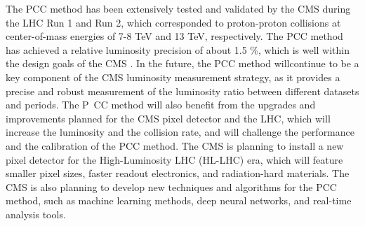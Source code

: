 The PCC method has been extensively tested and validated by the CMS during the LHC Run 1 and Run 2, which corresponded to proton-proton collisions at center-of-mass energies of 7-8 TeV and 13 TeV, respectively. The PCC method has achieved a relative luminosity precision of about 1.5 \%, which is well within the design goals of the CMS \cite{pas_18}. In the future, the PCC method willcontinue to be a key component of the CMS luminosity measurement strategy, as it provides a precise and robust measurement of the luminosity ratio between different datasets and periods. The P\
CC method will also benefit from the upgrades and improvements planned for the CMS pixel detector and the LHC, which will increase the luminosity and the collision rate, and will challenge the performance and the calibration of the PCC method. The CMS is planning to install a new pixel detector for the High-Luminosity LHC (HL-LHC) era, which will feature smaller pixel sizes, faster readout electronics, and radiation-hard materials. The CMS is also planning to develop new techniques and algorithms for the PCC method, such as machine learning methods, deep neural networks, and real-time analysis tools.
